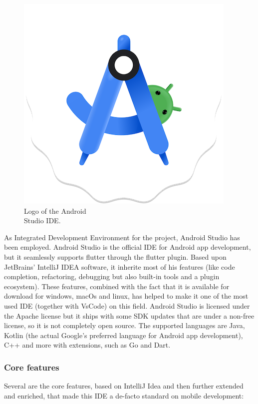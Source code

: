 \begin{figure} %
    \centering
    \includegraphics[width=\linewidth]{images/android_studio.png}
    \caption{Logo of the Android\\Studio IDE.}
\end{figure}

As Integrated Development Environment for the project, Android Studio has been employed. Android Studio is the official IDE for Android app development, but it seamlessly supports flutter through the flutter plugin. Based upon JetBrains' IntelliJ IDEA software, it inherite most of his features (like code completion, refactoring, debugging but also built-in tools and a plugin ecosystem). These features, combined with the fact that it is available for download for windows, macOs and linux, has helped to make it one of the most used IDE (together with VsCode) on this field. Android Studio is licensed under the Apache license but it ships with some SDK updates that are under a non-free license, so it is not completely open source. The supported languages are Java, Kotlin (the actual Google's preferred language for Android app development), C++ and more with extensions, such as Go and Dart\cite{AndroidStudio}. 

\subsubsection{Core features}
Several are the core features, based on IntelliJ Idea and then further extended and enriched, that made this IDE a de-facto standard on mobile development:

